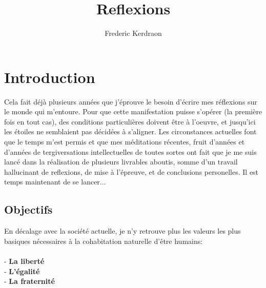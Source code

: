 \documentclass[11pt]{article} %
\title{Reflexions}
\author{Frederic Kerdraon}
\begin{document}
\maketitle

\section{Introduction}

Cela fait déjà plusieurs années que j'éprouve le besoin d'écrire mes réflexions sur le monde qui m'entoure.
Pour que cette manifestation puisse s'opérer (la première fois en tout cas), des conditions particulières doivent être à l'oeuvre, et jusqu'ici les étoiles ne semblaient pas décidées à s'aligner.
Les circonstances actuelles font que le temps m'est permis et que mes méditations récentes, fruit d'années et d'années de tergiversations intellectuelles de toutes sortes ont fait que je me suis lancé dans la réalisation de plusieurs livrables aboutis, somme d'un travail hallucinant de reflexions, de mise à l'épreuve, et de conclusions personelles.
Il est temps maintenant de se lancer...
\subsection{Objectifs}
En décalage avec la société actuelle, je n'y retrouve plus les valeurs les plus basiques nécessaires à la cohabitation naturelle d'être humains:\\\\
- \textbf{La liberté}\\
- \textbf{L'égalité}\\
- \textbf{La fraternité}\\
\end{document}
